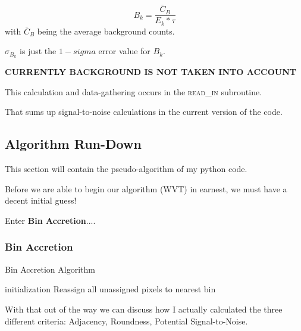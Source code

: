 \documentclass[11pt,letterpaper]{article}
\begin{document}
\begin{equation}
B_k = \frac{\bar{C}_B}{E_k*\tau}
\end{equation}
with $\bar{C}_B$ being the average background counts.

$\sigma_{B_k}$ is just the $1-sigma$ error value for $B_k$.

\textbf{CURRENTLY BACKGROUND IS NOT TAKEN INTO ACCOUNT}

This calculation and data-gathering occurs in the \textsc{read\_in} subroutine. 

That sums up signal-to-noise calculations in the current version of the code.

\subsection{Algorithm Run-Down}
This section will contain the pseudo-algorithm of my python code.

Before we are able to begin our algorithm (WVT) in earnest, we must have a decent initial guess! 

Enter \textbf{Bin Accretion}....
\subsubsection{Bin Accretion}
\begin{algorithm}[H]\label{algo:BA}
	\caption{Bin Accretion Algorithm}
	initialization\;
	Reassign all unassigned pixels to nearest bin\;
\end{algorithm}

With that out of the way we can discuss how I actually calculated the three different criteria: Adjacency, Roundness, Potential Signal-to-Noise.
\end{document}
